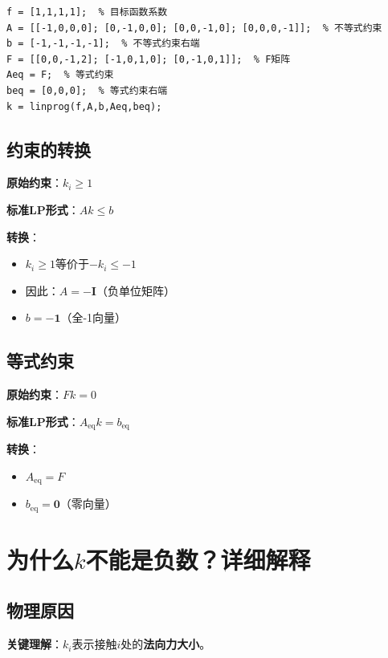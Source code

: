 \documentclass[12pt,a4paper]{article}
\begin{document}
\begin{verbatim}
f = [1,1,1,1];  % 目标函数系数
A = [[-1,0,0,0]; [0,-1,0,0]; [0,0,-1,0]; [0,0,0,-1]];  % 不等式约束
b = [-1,-1,-1,-1];  % 不等式约束右端
F = [[0,0,-1,2]; [-1,0,1,0]; [0,-1,0,1]];  % F矩阵
Aeq = F;  % 等式约束
beq = [0,0,0];  % 等式约束右端
k = linprog(f,A,b,Aeq,beq);
\end{verbatim}

\subsection{约束的转换}

\textbf{原始约束}：$k_i \geq 1$

\textbf{标准LP形式}：$A k \leq b$

\textbf{转换}：
\begin{itemize}
\item $k_i \geq 1$等价于$-k_i \leq -1$
\item 因此：$A = -\mathbf{I}$（负单位矩阵）
\item $b = -\mathbf{1}$（全-1向量）
\end{itemize}

\subsection{等式约束}

\textbf{原始约束}：$F k = 0$

\textbf{标准LP形式}：$A_{\text{eq}} k = b_{\text{eq}}$

\textbf{转换}：
\begin{itemize}
\item $A_{\text{eq}} = F$
\item $b_{\text{eq}} = \mathbf{0}$（零向量）
\end{itemize}

\section{为什么$k$不能是负数？详细解释}

\subsection{物理原因}

\textbf{关键理解}：$k_i$表示接触$i$处的\textbf{法向力大小}。
\end{document}
